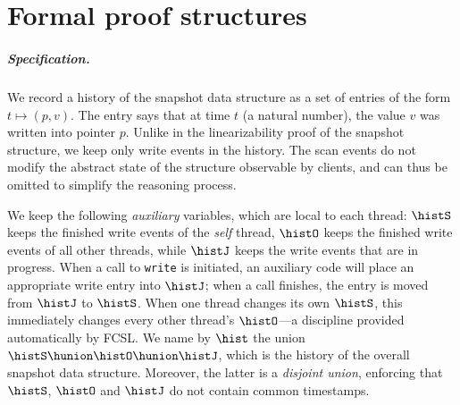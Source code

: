\section{Formal proof structures}
\label{sc:formal}

\def\histx{\hist_\x}
\def\histy{\hist_\y}
\def\histp{\hist_p}
\def\ordlist{L}
\renewcommand{\tleq}{\mathrel{\leq_\ordlist}}
\renewcommand{\tle}{\mathrel{<_\ordlist}}
\renewcommand{\jleq}{\mathrel{\sqsubseteq_\ordlist}}
\newcommand{\E}{E}
\newcommand{\C}{C}
\newcommand{\sx}{S_\x}
\newcommand{\sy}{S_\y}
\newcommand{\spp}{S_p}
\newcommand{\sss}{S_s}
\newcommand{\wx}{W_\x}
\newcommand{\wy}{W_\y}
\newcommand{\wpp}{W_p}
\newcommand{\admissible}{\mathsf{fine}}

\newcommand{\wInit}{\mathsf{W_{off}}}
\newcommand{\wWrite}{\mathsf{New}}
\newcommand{\wDirty}{\mathsf{NeedsFwd}}
\newcommand{\wClean}{\mathsf{Done}}
\newcommand{\sOn}{\mathsf{S_{on}}}
\newcommand{\sOff}{\mathsf{S_{off}}}



\subparagraph*{Specification.}
%
We record a history of the snapshot data structure as a set of entries
of the form $t \mapsto (p, v)$. The entry says that at time $t$ (a
natural number), the value $v$ was written into pointer $p$. Unlike in
the linearizability proof of the snapshot structure, we keep only
write events in the history. The scan events do not modify the
abstract state of the structure observable by clients, and can thus be
omitted to simplify the reasoning process.

We keep the following \emph{auxiliary} variables, which are local to
each thread: $\histS$ keeps the finished write events of the
\emph{self} thread, $\histO$ keeps the finished write events of all
other threads, while $\histJ$ keeps the write events that are in
progress. When a call to {\tt write} is initiated, an auxiliary code
will place an appropriate write entry into $\histJ$; when a call
finishes, the entry is moved from $\histJ$ to $\histS$. When one
thread changes its own $\histS$, this immediately changes every other
thread's $\histO$---a discipline provided automatically by FCSL. We
name by $\hist$ the union $\histS \hunion \histO \hunion \histJ$,
which is the history of the overall snapshot data structure. Moreover,
the latter is a \emph{disjoint union}, enforcing that $\histS$, $\histO$
and $\histJ$ do not contain common timestamps.

